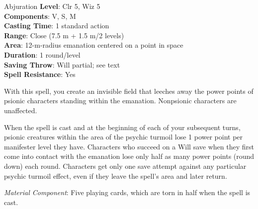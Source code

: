 {Abjuration}
{
	\textbf{Level}: Clr 5, Wiz 5\\
	\textbf{Components}: V, S, M\\
	\textbf{Casting Time}: 1 standard action\\
	\textbf{Range}: Close (7.5 m + 1.5 m/2 levels)\\
	\textbf{Area}: 12-m-radius emanation centered on a point in space\\
	\textbf{Duration}: 1 round/level\\
	\textbf{Saving Throw}: Will partial; see text\\
	\textbf{Spell Resistance}: Yes\\
}
{
	With this spell, you create an invisible field that leeches away the power points of psionic characters standing within the emanation. Nonpsionic characters are unaffected.

	When the spell is cast and at the beginning of each of your subsequent turns, psionic creatures within the area of the psychic turmoil lose 1 power point per manifester level they have. Characters who succeed on a Will save when they first come into contact with the emanation lose only half as many power points (round down) each round. Characters get only one save attempt against any particular psychic turmoil effect, even if they leave the spell's area and later return.

	\textit{Material Component}: Five playing cards, which are torn in half when the spell is cast.
}